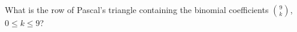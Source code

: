 \documentclass[../main.tex]{subfiles}
\begin{document}
What is the row of Pascal's triangle containing the binomial coefficients $\binom{9}{k}$, $0 \leq k \leq 9$?

\solution
\end{document}
